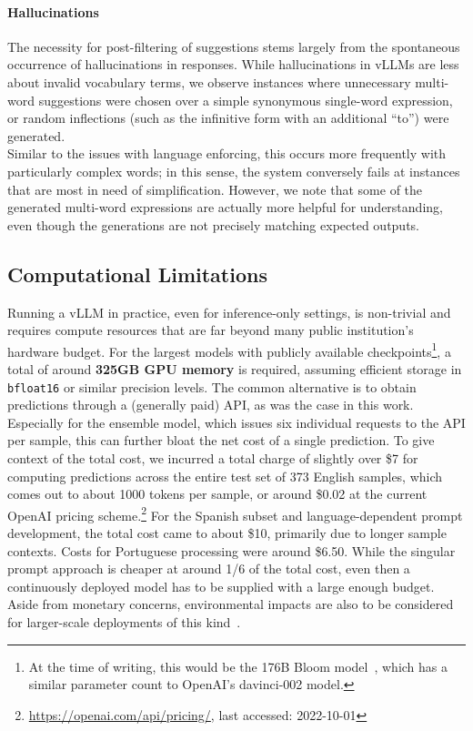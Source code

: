 \documentclass[11pt]{article}
\newcommand{\todo}[1]{\textcolor{red}{TODO: #1}}
\begin{document}
\paragraph{Hallucinations}
The necessity for post-filtering of suggestions stems largely from the spontaneous occurrence of hallucinations in responses. While hallucinations in vLLMs are less about invalid vocabulary terms, we observe instances where unnecessary multi-word suggestions were chosen over a simple synonymous single-word expression, or random inflections (such as the infinitive form with an additional ``to'') were generated.\\
Similar to the issues with language enforcing, this occurs more frequently with particularly complex words; in this sense, the system conversely fails at instances that are most in need of simplification.
However, we note that some of the generated multi-word expressions are actually more helpful for understanding, even though the generations are not precisely matching expected outputs.





\subsection{Computational Limitations}
\label{sec:budget}
Running a vLLM in practice, even for inference-only settings, is non-trivial and requires compute resources that are far beyond many public institution's hardware budget. For the largest models with publicly available checkpoints\footnote{At the time of writing, this would be the 176B Bloom model~\cite{bigscience-2022-bloom}, which has a similar parameter count to OpenAI's davinci-002 model.}, a total of around \textbf{325GB GPU memory} is required, assuming efficient storage in \texttt{bfloat16} or similar precision levels.
The common alternative is to obtain predictions through a (generally paid) API, as was the case in this work. Especially for the ensemble model, which issues six individual requests to the API per sample, this can further bloat the net cost of a single prediction.
To give context of the total cost, we incurred a total charge of slightly over \$7 for computing predictions across the entire test set of 373 English samples, which comes out to about 1000 tokens per sample, or around \$0.02 at the current OpenAI pricing scheme.\footnote{\url{https://openai.com/api/pricing/}, last accessed: 2022-10-01}
For the Spanish subset and language-dependent prompt development, the total cost came to about \$10, primarily due to longer sample contexts. Costs for Portuguese processing were around \$6.50.
While the singular prompt approach is cheaper at around 1/6 of the total cost, even then a continuously deployed model has to be supplied with a large enough budget.
Aside from monetary concerns, environmental impacts are also to be considered for larger-scale deployments of this kind~\cite{lacoste-etal-2019-quantifying}.
\end{document}
